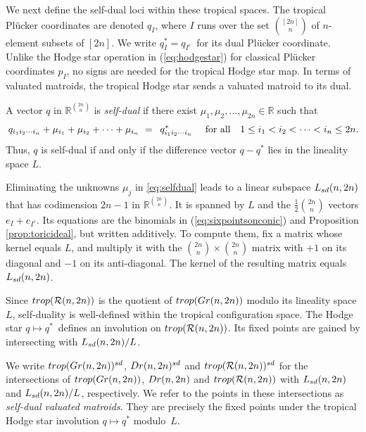 \documentclass[12pt]{extarticle}
\theoremstyle{definition}
\numberwithin{theorem}{section}
\theoremstyle{plain}\newtheorem{ithm}{Theorem}
\newcommand{\RR}{\mathbb{R}}
\begin{document}
  We next define the self-dual loci within these tropical spaces.
  The tropical Pl\"ucker coordinates are denoted $q_I$,
  where $I$ runs over the set $\binom{[2n]}{n}$ of $n$-element subsets of $[2n]$.
  We write $q^*_I = q_{I^c}\,$ for its dual Pl\"ucker coordinate. 
  Unlike the Hodge star operation in (\ref{eq:hodgestar})
  for classical Pl\"ucker coordinates $p_I$,
  no signs are needed for the tropical Hodge star map.
  In terms of valuated matroids, the tropical Hodge star sends a valuated matroid to its dual. 
 
    A vector $q$ in $\RR^{\binom{2n}{n}}$  is  {\em self-dual}
    if there exist  $\mu_1,\mu_2,\ldots,\mu_{2n} \in \RR$ such that 
    \begin{equation}
      \label{eq:selfdual}
      \,q_{i_1 i_2 \cdots i_n}  + 
      \mu_{i_1} + \mu_{i_2} + \cdots + \mu_{i_n} \,\,= \,\,\,q^*_{i_1 i_2 \cdots i_n} \,\,\quad \hbox{for all} \quad 1 \leq i_1 < i_2 < \cdots < i_n \leq 2n. 
    \end{equation}
    Thus, $q$ is self-dual if and only if the 
    difference  vector $q-q^*$ lies in the lineality space $L$.
\medskip

  Eliminating the unknowns $\mu_j$ in
  \eqref{eq:selfdual} leads to a linear subspace $L_{\rm sd}(n,2n)$ 
  that has codimension $2n-1$ in $\RR^{\binom{2n}{n}}$. It is spanned by $L$ and the
  $\frac{1}{2}\binom{2n}{n}$ vectors $e_I + e_{I^c}$.
Its equations are the binomials in
(\ref{eq:sixpointsonconic})  and Proposition \ref{prop:toricideal}, but written additively.
To compute them, fix
a matrix whose kernel equals $L$,
 and multiply it with the $\binom{2n}{n}\times \binom{2n}{n}$ matrix with $+1$ on its diagonal and $-1$ on its anti-diagonal. The kernel of the resulting matrix equals $L_{\rm sd}(n,2n)$.



  Since ${\rm trop}(\mathcal{R}(n,2n))$ is the quotient of 
  $ {\rm trop}({\rm Gr}(n,2n))$ modulo its lineality space $L$,
  self-duality is well-defined within the tropical configuration space.
  The Hodge star $q \mapsto q^*$~defines an involution on
  ${\rm trop}(\mathcal{R}(n,2n))$. Its fixed points are gained by intersecting with $L_{\rm sd}(n,2n)/L$.

  
 
We write ${\rm trop}({\rm Gr}(n,2n))^{\rm sd}$,
${\rm Dr}(n,2n)^{\rm sd}$ and  ${\rm trop}(\mathcal{R}(n,2n))^{\rm sd}$ for the intersections of
${\rm trop}({\rm Gr}(n,2n))$, ${\rm Dr}(n,2n)$ and  ${\rm trop}(\mathcal{R}(n,2n))$
 with  $L_{\rm sd}(n,2n)$ and $L_{\rm sd}(n,2n)/L$, respectively.
We refer to the points in these intersections as {\em self-dual valuated matroids}. 
They are precisely the fixed points under the tropical Hodge star involution
$q \mapsto q^*$ %
modulo~$L$.
\medskip
  
\end{document}
